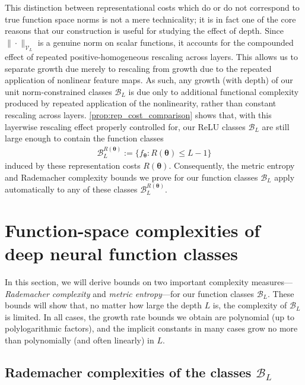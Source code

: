 \documentclass{article}
\def\vtheta{{\bm{\theta}}}
\def\cB{{\mathcal{B}}}
\begin{document}
This distinction between representational costs which do or do not correspond to true function space norms is not a mere technicality; it is in fact one of the core reasons that our construction is useful for studying the effect of depth. Since $\|\cdot\|_{\mathcal V_L}$ is a genuine norm on scalar functions, it accounts for the compounded effect of repeated positive-homogeneous rescaling across layers. This allows us to separate growth due merely to rescaling from growth due to the repeated application of nonlinear feature maps. As such, any growth (with depth) of our unit norm-constrained classes $\cB_L$ is due only to additional functional complexity produced by repeated application of the nonlinearity, rather than constant rescaling across layers. \cref{prop:rep_cost_comparison} shows that, with this layerwise rescaling effect properly controlled for, our ReLU classes $\mathcal B_L$ are still large enough to contain the function classes
\begin{align}
    \cB_L^{R(\vtheta)} := \{ f_{\vtheta}: R(\vtheta) \leq L-1 \}
\end{align}
induced by these representation costs $R(\vtheta)$. Consequently, the metric entropy and Rademacher complexity bounds we prove for our function classes $\cB_L$ apply automatically to any of these classes $\cB_L^{R(\vtheta)}$. 


\section{Function-space complexities of deep neural function classes} \label{sec:statistical_complexities}
In this section, we will derive bounds on two important complexity measures---\textit{Rademacher complexity} and \textit{metric entropy}---for our function classes $\cB_L$. These bounds will show that, no matter how large the depth $L$ is, the complexity of $\cB_L$ is limited. In all cases, the growth rate bounds we obtain are polynomial (up to polylogarithmic factors), and the implicit constants in many cases grow no more than polynomially (and often linearly) in $L$.

\subsection{Rademacher complexities of the classes $\cB_L$} \label{sec:rad_complexity}
\end{document}
